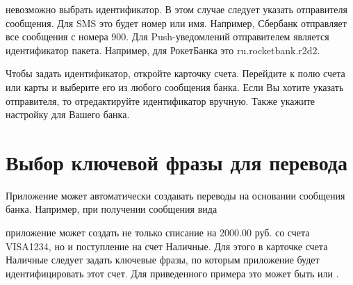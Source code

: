 \documentclass[a4paper,10pt,russian]{sphinxmanual}
\begin{document}
невозможно выбрать идентификатор. В этом случае следует указать отправителя сообщения. Для SMS это будет номер или
имя. Например, Сбербанк отправляет все сообщения с номера 900. Для Push-уведомлений отправителем является идентификатор пакета.
Например, для РокетБанка это ru.rocketbank.r2d2.

Чтобы задать идентификатор, откройте карточку счета. Перейдите к полю  счета или карты и выберите его из любого
сообщения банка. Если Вы хотите указать отправителя, то отредактируйте идентификатор вручную.
Также укажите настройку для Вашего банка.

\noindent{}

\noindent{}

\noindent{}

\noindent{}

\noindent{}

\noindent{}


\section{Выбор ключевой фразы для перевода}
\label{\detokenize{account-identities:id2}}
Приложение может автоматически создавать переводы на основании сообщения банка. Например, при получении сообщения вида

\begin{sphinxVerbatim}[commandchars=\\\{\}]
          
\end{sphinxVerbatim}

приложение может создать не только списание на 2000.00 руб. со счета VISA1234, но и поступление на счет Наличные. Для этого в карточке
счета Наличные следует задать ключевые фразы, по которым приложение будет идентифицировать этот счет. Для приведенного примера
это может быть  или .
\end{document}
